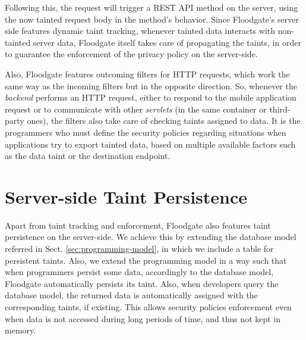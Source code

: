 Following this, the request will trigger a REST API method on the server, using the now tainted request body in the method's behavior. Since Floodgate's server side features dynamic taint tracking, whenever tainted data interacts with non-tainted server data, Floodgate itself takes care of propagating the taints, in order to guarantee the enforcement of the privacy policy on the server-side.

Also, Floodgate features outcoming filters for HTTP requests, which work the same way as the incoming filters but in the opposite direction. So, whenever the \textit{backend} performs an HTTP request, either to respond to the mobile application request or to communicate with other \textit{servlets} (in the same container or third-party ones), the filters also take care of checking taints assigned to data. It is the programmers who must define the security policies regarding situations when applications try to export tainted data, based on multiple available factors such as the data taint or the destination endpoint.

\section{Server-side Taint Persistence}
\label{sec:server-side-taint-persistence}

Apart from taint tracking and enforcement, Floodgate also features taint persistence on the server-side. We achieve this by extending the database model referred in Sect. \ref{sec:programming-model}, in which we include a table for persistent taints. Also, we extend the programming model in a way such that when programmers persist some data, accordingly to the database model, Floodgate automatically persists its taint. Also, when developers query the database model, the returned data is automatically assigned with the corresponding taints, if existing. This allows security policies enforcement even when data is not accessed during long periods of time, and thus not kept in memory.